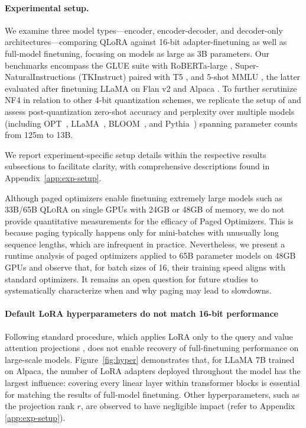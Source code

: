 \paragraph{Experimental setup.} We examine three model types—encoder, encoder-decoder, and decoder-only architectures—comparing QLoRA against 16-bit adapter-finetuning as well as full-model finetuning, focusing on models as large as 3B parameters. Our benchmarks encompass the GLUE suite \citep{wang2018glue} with RoBERTa-large \citep{liu2019roberta}, Super-NaturalInstructions (TKInstruct) \citep{wang2022super} paired with T5 \citep{t5}, and 5-shot MMLU \citep{hendrycksmeasuring}, the latter evaluated after finetuning LLaMA on Flan v2 \citep{longpre2023flan} and Alpaca \citep{alpaca}. To further scrutinize NF4 in relation to other 4-bit quantization schemes, we replicate the setup of \citet{dettmers2022case} and assess post-quantization zero-shot accuracy and perplexity over multiple models (including OPT~\citep{zhang2022opt}, LLaMA~\citep{touvron2023llama}, BLOOM~\citep{scao2022bloom}, and Pythia~\citep{biderman2023pythia}) spanning parameter counts from 125m to 13B.

We report experiment-specific setup details within the respective results subsections to facilitate clarity, with comprehensive descriptions found in Appendix~\ref{app:exp-setup}.

Although paged optimizers enable finetuning extremely large models such as 33B/65B \textsc{QLoRA} on single GPUs with 24GB or 48GB of memory, we do not provide quantitative measurements for the efficacy of Paged Optimizers. This is because paging typically happens only for mini-batches with unusually long sequence lengths, which are infrequent in practice. Nevertheless, we present a runtime analysis of paged optimizers applied to 65B parameter models on 48GB GPUs and observe that, for batch sizes of 16, their training speed aligns with standard optimizers. It remains an open question for future studies to systematically characterize when and why paging may lead to slowdowns.

\paragraph{Default LoRA hyperparameters do not match 16-bit performance}

Following standard procedure, which applies LoRA only to the query and value attention projections \citep{hu2021lora}, does not enable recovery of full-finetuning performance on large-scale models. Figure~\ref{fig:hyper} demonstrates that, for LLaMA 7B trained on Alpaca, the number of LoRA adapters deployed throughout the model has the largest influence: covering every linear layer within transformer blocks is essential for matching the results of full-model finetuning. Other hyperparameters, such as the projection rank $r$, are observed to have negligible impact (refer to Appendix \ref{app:exp-setup}).

